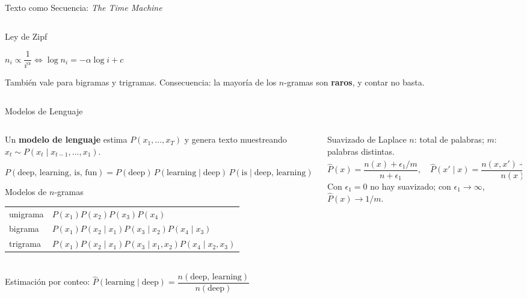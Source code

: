 \documentclass[aspectratio=169, 10pt]{beamer}
\newcommand{\formula}[1]{%
	\begin{tcolorbox}[colback=UCMBlue!8, colframe=UCMBlue, arc=4pt,
		boxsep=2pt, left=6pt, right=6pt, top=3pt, bottom=3pt]
		#1
	\end{tcolorbox}
}
\begin{document}
\begin{frame}{Texto como Secuencia: \textit{The Time Machine}}
\begin{columns}[T]
\begin{column}{0.47\textwidth}
			\begin{block}{Ley de Zipf}
				\formula{\centering $n_i \propto \dfrac{1}{i^{\alpha}} \iff \log n_i = -\alpha \log i + c$}
				\scriptsize
				Tambi\'en vale para bigramas y trigramas. Consecuencia: la mayor\'ia de los $n$-gramas son \textbf{raros}, y contar no basta.
			\end{block}
		\end{column}
	\end{columns}

\end{frame}

\begin{frame}[shrink]{Modelos de Lenguaje}

	\begin{columns}[T]
		\begin{column}{0.5\textwidth}
			\small
			Un \textbf{modelo de lenguaje} estima $P(x_1,\ldots,x_T)$ y genera texto muestreando $x_t \sim P(x_t\mid x_{t-1},\ldots,x_1)$.

			\vspace{0.1cm}
			{\scriptsize $P(\text{deep, learning, is, fun}) = P(\text{deep})\,P(\text{learning}\mid\text{deep})\,P(\text{is}\mid\text{deep, learning})\,P(\text{fun}\mid\ldots)$}

			\begin{block}{Modelos de $n$-gramas}
				\scriptsize
				\begin{tabular}{@{}ll@{}}
					unigrama & $P(x_1)P(x_2)P(x_3)P(x_4)$ \\
					bigrama & $P(x_1)P(x_2\mid x_1)P(x_3\mid x_2)P(x_4\mid x_3)$ \\
					trigrama & $P(x_1)P(x_2\mid x_1)P(x_3\mid x_1,x_2)P(x_4\mid x_2,x_3)$
				\end{tabular}
				\\[3pt]
				Estimaci\'on por conteo: $\hat{P}(\text{learning}\mid\text{deep}) = \dfrac{n(\text{deep, learning})}{n(\text{deep})}$
			\end{block}
		\end{column}

		\begin{column}{0.47\textwidth}
			\begin{block}{Suavizado de Laplace}
				\scriptsize
				$n$: total de palabras; $m$: palabras distintas.
				\[
					\hat{P}(x) = \frac{n(x) + \epsilon_1/m}{n + \epsilon_1},\quad
					\hat{P}(x'\mid x) = \frac{n(x,x') + \epsilon_2\hat{P}(x')}{n(x) + \epsilon_2}
				\]
				Con $\epsilon_1 = 0$ no hay suavizado; con $\epsilon_1\to\infty$, $\hat{P}(x)\to 1/m$.
			\end{block}


\end{column}
\end{columns}
\end{frame}
\end{document}

